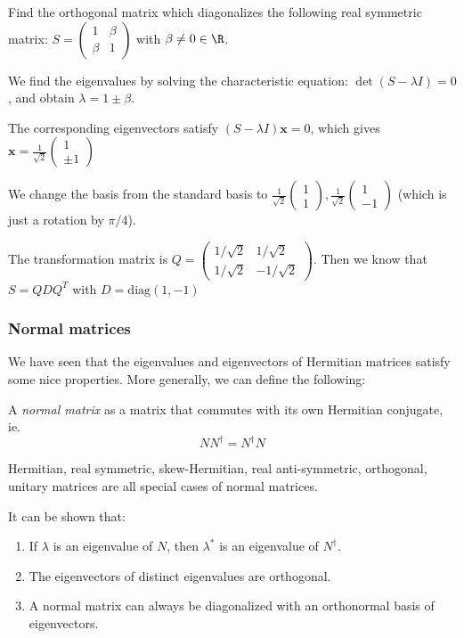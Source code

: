 \documentclass[a4paper]{article}
\begin{document}
\begin{eg}
  Find the orthogonal matrix which diagonalizes the following real symmetric matrix: $S =
  \begin{pmatrix}
    1 & \beta\\
    \beta & 1
  \end{pmatrix}$ with $\beta \not= 0 \in \R$.

  We find the eigenvalues by solving the characteristic equation: $\det(S - \lambda I) = 0$, and obtain $\lambda = 1\pm \beta$.

  The corresponding eigenvectors satisfy $(S - \lambda I)\mathbf{x} = 0$, which gives $\displaystyle \mathbf{x} = \frac{1}{\sqrt{2}}
  \begin{pmatrix}
    1\\
    \pm1
  \end{pmatrix}$

  We change the basis from the standard basis to $
  \displaystyle
  \frac{1}{\sqrt{2}}\begin{pmatrix}
    1\\1
  \end{pmatrix},
  \frac{1}{\sqrt{2}}
  \begin{pmatrix}
    1\\-1
  \end{pmatrix}$ (which is just a rotation by $\pi/4$).

  The transformation matrix is $
  Q = \begin{pmatrix}
    1/\sqrt{2} & 1/\sqrt{2}\\
    1/\sqrt{2} & -1/\sqrt{2}
  \end{pmatrix}$. Then we know that $S = QDQ^T$ with $D = \mathrm{diag}(1, -1)$
\end{eg}
\subsubsection{Normal matrices}
We have seen that the eigenvalues and eigenvectors of Hermitian matrices satisfy some nice properties. More generally, we can define the following:
\begin{defi}
  A \emph{normal matrix} as a matrix that commutes with its own Hermitian conjugate, ie.
  \[
    NN^\dagger = N^\dagger N
  \]
\end{defi}
Hermitian, real symmetric, skew-Hermitian, real anti-symmetric, orthogonal, unitary matrices are all special cases of normal matrices.

It can be shown that:
\begin{prop}\leavevmode
  \begin{enumerate}
    \item If $\lambda$ is an eigenvalue of $N$, then $\lambda^*$ is an eigenvalue of $N^\dagger$.
    \item The eigenvectors of distinct eigenvalues are orthogonal.
    \item A normal matrix can always be diagonalized with an orthonormal basis of eigenvectors.
  \end{enumerate}
\end{prop}
\end{document}

